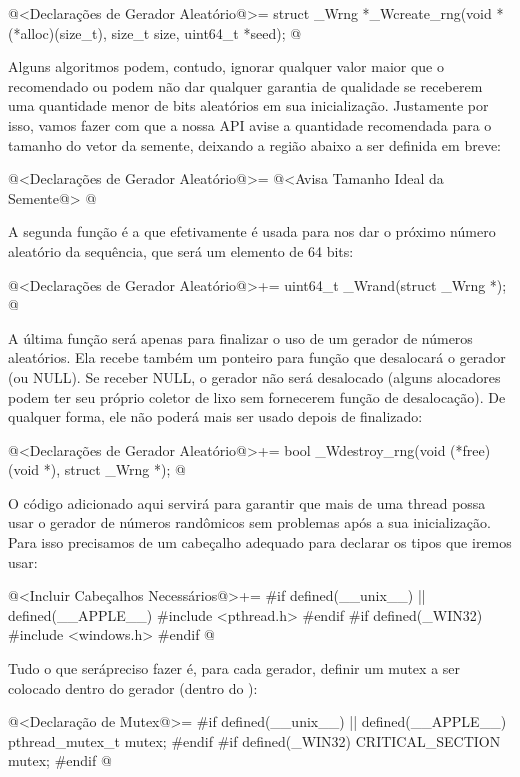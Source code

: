 \iniciocodigo
@<Declarações de Gerador Aleatório@>=
struct _Wrng *_Wcreate_rng(void *(*alloc)(size_t), size_t size, uint64_t *seed);
@
\fimcodigo

Alguns algoritmos podem, contudo, ignorar qualquer valor maior que o
recomendado ou podem não dar qualquer garantia de qualidade se
receberem uma quantidade menor de bits aleatórios em sua
inicialização. Justamente por isso, vamos fazer com que a nossa API
avise a quantidade recomendada para o tamanho do vetor da semente,
deixando a região abaixo a ser definida em breve:

\iniciocodigo
@<Declarações de Gerador Aleatório@>=
@<Avisa Tamanho Ideal da Semente@>
@
\fimcodigo


A segunda função é a que efetivamente é usada para nos dar o próximo
número aleatório da sequência, que será um elemento de 64 bits:

\iniciocodigo
@<Declarações de Gerador Aleatório@>+=
uint64_t _Wrand(struct _Wrng *);
@
\fimcodigo

A última função será apenas para finalizar o uso de um gerador de
números aleatórios. Ela recebe também um ponteiro para função que
desalocará o gerador (ou NULL). Se receber NULL, o gerador não será
desalocado (alguns alocadores podem ter seu próprio coletor de lixo
sem fornecerem função de desalocação). De qualquer forma, ele não
poderá mais ser usado depois de finalizado:

\iniciocodigo
@<Declarações de Gerador Aleatório@>+=
bool _Wdestroy_rng(void (*free)(void *), struct _Wrng *);
@
\fimcodigo


O código adicionado aqui servirá para garantir que mais de uma thread
possa usar o gerador de números randômicos sem problemas após a sua
inicialização. Para isso precisamos de um cabeçalho adequado para
declarar os tipos que iremos usar:

\iniciocodigo
@<Incluir Cabeçalhos Necessários@>+=
#if defined(__unix__) || defined(__APPLE__)
#include <pthread.h>
#endif
#if defined(_WIN32)
#include <windows.h>
#endif
@
\fimcodigo

Tudo o que serápreciso fazer é, para cada gerador, definir um mutex a
ser colocado dentro do gerador (dentro do ):

\iniciocodigo
@<Declaração de Mutex@>=
#if defined(__unix__) || defined(__APPLE__)
pthread_mutex_t mutex;
#endif
#if defined(_WIN32)
CRITICAL_SECTION mutex;
#endif
@
\fimcodigo

